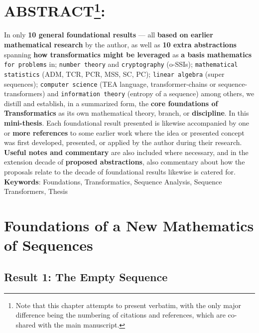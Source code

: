 \documentclass[a4paper, 18pt]{book} %
\begin{document}
\begin{appendices}
\section*{ABSTRACT\footnote{Note that this chapter attempts to present \cite{Lutalo2025_transformatics_thesis} verbatim, with the only major difference being the numbering of citations and references, which are co-shared with the main manuscript.}:}
In only \textbf{10 general foundational results}\cite{lutalo_2025_trans101_1page} --- all \textbf{based on earlier mathematical research} by the author, as well as \textbf{10 extra abstractions} spanning \textbf{how transformatics might be leveraged} as \textbf{a basis mathematics} \texttt{for problems} in; \texttt{number theory} and \texttt{cryptography} (o-SSIs); \texttt{mathematical statistics} (ADM, TCR, PCR, MSS, SC, PC); \texttt{linear algebra} (super sequences); \texttt{computer science} (TEA language, transformer-chains or sequence-transformers) and \texttt{information theory} (entropy of a sequence) among others, we distill and establish, in a summarized form, the \textbf{core foundations of Transformatics}\cite{transformatics} as its own mathematical theory, branch, or \textbf{discipline}. In this \textbf{mini-thesis}. Each foundational result presented is likewise accompanied by one or \textbf{more references} to some earlier work where the idea or presented concept was first developed, presented, or applied by the author during their research. \textbf{Useful notes and commentary} are also included where necessary, and in the extension decade of \textbf{proposed abstractions}, also commentary about how the proposals relate to the decade of foundational results likewise is catered for.
 \newline\newline
     \textbf{Keywords}: Foundations, Transformatics, Sequence Analysis,  Sequence Transformers, Thesis

\section{Foundations of a New Mathematics of Sequences}
\label{SECFOUND}

\subsection{Result 1: The Empty Sequence\cite{lnspaper}}
\label{RES1}


\end{appendices}
\end{document}
